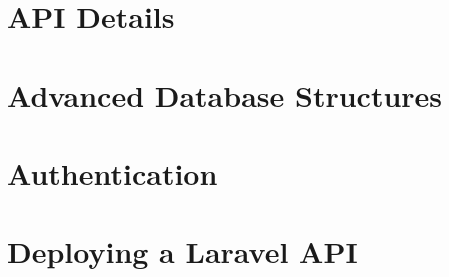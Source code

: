 \documentclass[b5paper,openany]{book}
\begin{document}
\chapter{API Details}


\chapter{Advanced Database Structures}

\pagebreak


\chapter{Authentication}


\chapter{Deploying a Laravel API}






\end{document}
